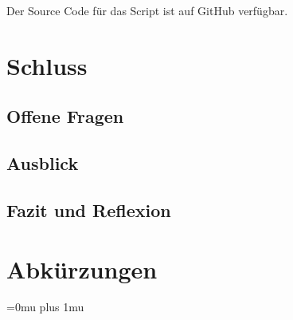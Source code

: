 \documentclass[a4paper,oneside, 12pt]{report}
\begin{document}
Der Source Code für das Script ist auf GitHub verfügbar.


\chapter{Schluss}\label{sec:schluss}
\section{Offene Fragen}
\section{Ausblick}
\section{Fazit und Reflexion}


\cleardoublepage
{}
{}
\chapter*{Abkürzungen}
\begin{acronym}[Abkürzungen]
\end{acronym}

\cleardoublepage
{}
{}
\Urlmuskip=0mu plus 1mu\relax
\end{document}
